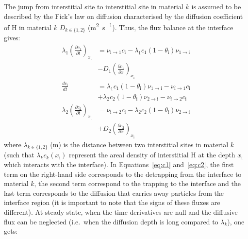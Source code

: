 \indent The jump from interstitial site to interstitial site in material $k$ is assumed to be described by the Fick's law on diffusion characterised by the diffusion coefficient of H in material $k$ $D_{k\in\lbrace 1,2\rbrace}$ (\si{m^{2}.s^{-1}}).
Thus, the flux balance at the interface gives:
\begin{align}
\lambda_1 \left( \frac{\partial c_1}{\partial t} \right)_{x_\mathrm{i}}
                      &= \nu_{\mathrm{i}\rightarrow 1}c_\mathrm{i}
                        -\lambda_1 c_1(1-\theta_\mathrm{i})\nu_{1\rightarrow\mathrm{i}}  \nonumber
                        \\&-D_1\left(\frac{\partial c_1}{\partial x}\right)_{x_\mathrm{i}}
                        \label{eq:c1}
                        \\
\frac{d c_\mathrm{i}}{d t} 
                     &= \lambda_1 c_1 (1-\theta_\mathrm{i})\nu_{1\rightarrow\mathrm{i}}
                       - \nu_{i\rightarrow 1}c_\mathrm{i} \nonumber
                       \\ &+\lambda_2 c_2 (1-\theta_\mathrm{i})\nu_{2\rightarrow\mathrm{i}}
                       - \nu_{i\rightarrow 2}c_\mathrm{i}
                       \label{eq:ci}
                       \\
\lambda_2 \left( \frac{\partial c_2}{\partial t}\right)_{x_\mathrm{i}}
                    &= \nu_{\mathrm{i}\rightarrow 2}c_\mathrm{i}
                      -\lambda_2 c_2 (1-\theta_\mathrm{i})\nu_{2\rightarrow\mathrm{i}} \nonumber
                      \\ &+D_2 \left(\frac{\partial c_2}{\partial x}\right)_{x_\mathrm{i}}
                      \label{eq:c2}
\end{align}
where $\lambda_{k\in\lbrace 1,2 \rbrace}$ (\si{m}) is the distance between two interstitial sites in material $k$ (such that $\lambda_k c_k(x_\mathrm{i})$ represent the areal density of interstitial H at the depth $x_\mathrm{i}$ which interacts with the interface).
In Equations~\ref{eq:c1} and~\ref{eq:c2}, the first term on the right-hand side corresponds to the detrapping from the interface to material $k$, the second term correspond to the trapping to the interface and the last term corresponds to the diffusion that carries away particles from the interface region (it is important to note that the signs of these fluxes are different).
\indent At steady-state, when the time derivatives are null and the diffusive flux can be neglected (i.e.\ when the diffusion depth is long compared to $\lambda_k$), one gets:

